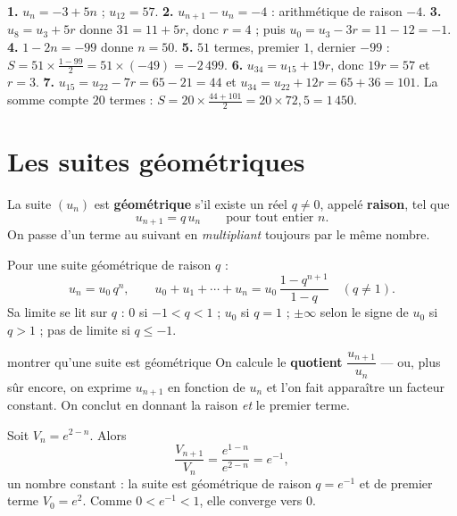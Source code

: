 \begin{corrige}
\textbf{1.} $u_{n} = -3+5n$ ; $u_{12} = 57$.
\textbf{2.} $u_{n+1}-u_{n} = -4$ : arithmétique de raison $-4$.
\textbf{3.} $u_{8} = u_{3}+5r$ donne $31 = 11+5r$, donc $r = 4$ ; puis
$u_{0} = u_{3}-3r = 11-12 = -1$.
\textbf{4.} $1-2n = -99$ donne $n = 50$.
\textbf{5.} $51$ termes, premier $1$, dernier $-99$ :
$S = 51\times\frac{1-99}{2} = 51\times(-49) = -2\,499$.
\textbf{6.} $u_{34} = u_{15}+19r$, donc $19r = 57$ et $r = 3$.
\textbf{7.} $u_{15} = u_{22}-7r = 65-21 = 44$ et
$u_{34} = u_{22}+12r = 65+36 = 101$. La somme compte $20$ termes :
$S = 20\times\frac{44+101}{2} = 20\times72{,}5 = 1\,450$.
\end{corrige}

\section{Les suites géométriques}

\begin{definition}
La suite $\left(u_{n}\right)$ est \textbf{géométrique} s'il existe un réel
$q \neq 0$, appelé \textbf{raison}, tel que
\[
  u_{n+1} = q\,u_{n} \qquad \text{pour tout entier } n .
\]
On passe d'un terme au suivant en \emph{multipliant} toujours par le même
nombre.
\end{definition}

\begin{propriete}
Pour une suite géométrique de raison $q$ :
\[
  u_{n} = u_{0}\,q^{n}, \qquad
  u_{0}+u_{1}+\cdots+u_{n} = u_{0}\,\frac{1-q^{n+1}}{1-q}
  \quad (q \neq 1).
\]
Sa limite se lit sur $q$ : $0$ si $-1<q<1$ ; $u_{0}$ si $q = 1$ ;
$\pm\infty$ selon le signe de $u_{0}$ si $q>1$ ; pas de limite si
$q \leq -1$.
\end{propriete}

\begin{methode}{montrer qu'une suite est géométrique}
On calcule le \textbf{quotient} $\dfrac{u_{n+1}}{u_{n}}$ — ou, plus sûr
encore, on exprime $u_{n+1}$ en fonction de $u_{n}$ et l'on fait apparaître
un facteur constant. On conclut en donnant la raison \emph{et} le premier
terme.
\end{methode}

\begin{exemple}
Soit $V_{n} = e^{2-n}$. Alors
\[
  \frac{V_{n+1}}{V_{n}} = \frac{e^{1-n}}{e^{2-n}} = e^{-1},
\]
un nombre constant : la suite est géométrique de raison $q = e^{-1}$ et de
premier terme $V_{0} = e^{2}$. Comme $0<e^{-1}<1$, elle converge vers $0$.
\end{exemple}


